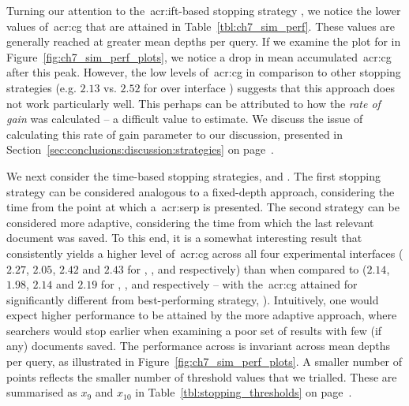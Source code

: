 Turning our attention to the~\gls{acr:ift}-based stopping strategy , we notice the lower values of~\gls{acr:cg} that are attained in Table~\ref{tbl:ch7_sim_perf}. These values are generally reached at greater mean depths per query. If we examine the plot for  in Figure~\ref{fig:ch7_sim_perf_plots}, we notice a drop in mean accumulated~\gls{acr:cg} after this peak. However, the low levels of~\gls{acr:cg} in comparison to other stopping strategies (e.g. $2.13$ vs. $2.52$ for  over interface ) suggests that this approach does not work particularly well. This perhaps can be attributed to how the \emph{rate of gain} was calculated -- a difficult value to estimate. We discuss the issue of calculating this rate of gain parameter to our discussion, presented in Section~\ref{sec:conclusions:discussion:strategies} on page~\pageref{sec:conclusions:discussion:strategies}.

We next consider the time-based stopping strategies,  and . The first stopping strategy can be considered analogous to a fixed-depth approach, considering the time from the point at which a~\gls{acr:serp} is presented. The second strategy can be considered more adaptive, considering the time from which the last relevant document was saved. To this end, it is a somewhat interesting result that  consistently yields a higher level of~\gls{acr:cg} across all four experimental interfaces ($2.27$, $2.05$, $2.42$ and $2.43$ for , ,  and  respectively) than when compared to  ($2.14$, $1.98$, $2.14$ and $2.19$ for , ,  and  respectively -- with the~\gls{acr:cg} attained for  significantly different from best-performing strategy, ). Intuitively, one would expect higher performance to be attained by the more adaptive approach, where searchers would stop earlier when examining a poor set of results with few (if any) documents saved. The performance across  is invariant across mean depths per query, as illustrated in Figure~\ref{fig:ch7_sim_perf_plots}. A smaller number of points reflects the smaller number of threshold values that we trialled. These are summarised as $x_9$ and $x_{10}$ in Table~\ref{tbl:stopping_thresholds} on page~\pageref{tbl:stopping_thresholds}.

